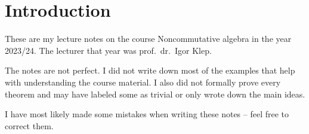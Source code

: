 \section*{Introduction}

These are my lecture notes on the course Noncommutative algebra in
the year 2023/24. The lecturer that year was prof.~dr.~Igor Klep.

The notes are not perfect. I did not write down most of the examples
that help with understanding the course material. I also did not
formally prove every theorem and may have labeled some as trivial or
only wrote down the main ideas.

I have most likely made some mistakes when writing these notes --
feel free to correct them.

